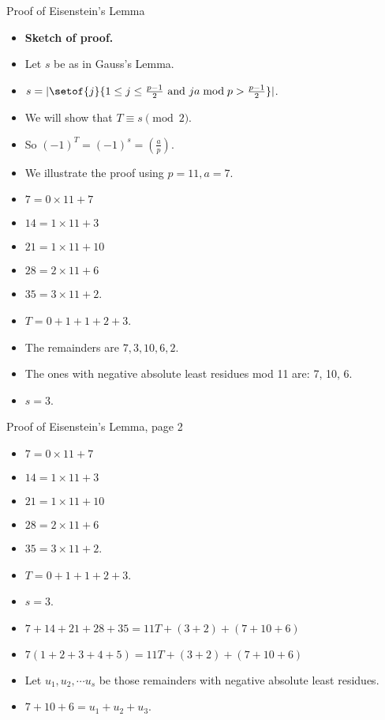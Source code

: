 \documentclass[handout]{beamer}
\begin{document}
\begin{frame}{Proof of Eisenstein's Lemma}

\begin{itemize}
  \item \textbf{Sketch of proof.}
  \item Let $s$ be as in Gauss's Lemma.
  \item $s = |\setof{j}{1\leq j \leq \frac{p-1}{2} \text{ and } ja\bmod p > \frac{p-1}{2}}|$.
  \item We will show that $T \equiv s \pmod 2$.
  \item So $(-1)^T = (-1)^s = (\frac{a}{p})$.
  \item We illustrate the proof using $p=11, a=7$.
  \item $7 = 0\times 11 + 7$
  \item $14 = 1\times 11 + 3$
  \item $21 = 1\times 11 + 10$
  \item $28 = 2\times 11 + 6$
  \item $35 = 3\times 11 + 2$.
  \item $T = 0 + 1 + 1 + 2 + 3$.
  \item The remainders are $7,3,10,6,2$.
  \item The ones with negative absolute least residues mod 11 are: 7, 10, 6.
  \item $s=3$.
\end{itemize}
\end{frame}



\begin{frame}{Proof of Eisenstein's Lemma, page 2}

\begin{itemize}
  \item $7 = 0\times 11 + 7$
  \item $14 = 1\times 11 + 3$
  \item $21 = 1\times 11 + 10$
  \item $28 = 2\times 11 + 6$
  \item $35 = 3\times 11 + 2$.
  \item $T = 0 + 1 + 1 + 2 + 3$.
  \item $s=3$.
  \item $7+14+21+28+35=11T + (3 + 2) + (7 + 10 + 6)$
  \item $7(1+2+3+4+5)=11T + (3 + 2) + (7 + 10 + 6)$
  \item Let $u_1, u_2, \cdots u_s$ be those remainders with negative absolute least residues.
  \item $7 + 10+ 6 = u_1 + u_2 + u_3 $.
\end{itemize}
\end{frame}
\end{document}

